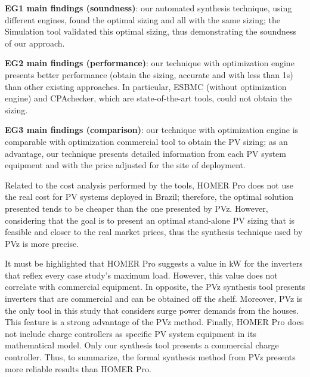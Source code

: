 \documentclass[review]{elsarticle}
\begin{document}
\begin{tcolorbox}
\textbf{EG1 main findings (soundness)}: our automated synthesis technique, using different engines, found the optimal sizing and all with the same sizing; the Simulation tool validated this optimal sizing, thus demonstrating the soundness of our approach.
\end{tcolorbox}

\begin{tcolorbox}
\textbf{EG2 main findings (performance)}: our technique with optimization engine presents better performance (obtain the sizing, accurate and with less than 1s) than other existing approaches. In particular, ESBMC (without optimization engine) and CPAchecker, which are state-of-the-art tools, could not obtain the sizing.
\end{tcolorbox}

\begin{tcolorbox}
\textbf{EG3 main findings (comparison)}: our technique with optimization engine is comparable with optimization commercial tool to obtain the PV  sizing; as an advantage, our technique presents detailed information from each PV system equipment and with the price adjusted for the site of deployment.
\end{tcolorbox}

Related to the cost analysis performed by the tools, HOMER Pro does not use the real cost for PV systems deployed in Brazil; therefore, the optimal solution presented tends to be cheaper than the one presented by PVz. However, considering that the goal is to present an optimal stand-alone PV sizing that is feasible and closer to the real market prices, thus the synthesis technique used by PVz is more precise.

It must be highlighted that HOMER Pro suggests a value in kW for the inverters that reflex every case study's maximum load. However, this value does not correlate with commercial equipment. In opposite, the PVz synthesis tool presents inverters that are commercial and can be obtained off the shelf. Moreover, PVz is the only tool in this study that considers surge power demands from the houses. This feature is a strong advantage of the PVz method. Finally, HOMER Pro does not include charge controllers as specific PV system equipment in its mathematical model. Only our synthesis tool presents a commercial charge controller. Thus, to summarize, the formal synthesis method from PVz presents more reliable results than HOMER Pro.
\end{document}
